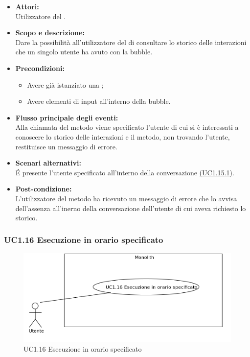 \begin{itemize}
	\item \textbf{Attori:}
	\\Utilizzatore del .
	\item \textbf{Scopo e descrizione:} 
	\\Dare la possibilità all'utilizzatore del  di consultare lo storico delle interazioni che un singolo utente ha avuto con la bubble.
	\item \textbf{Precondizioni:}
	\begin{itemize}
		\item Avere già istanziato una ;
		\item Avere elementi di input all'interno della bubble.
	\end{itemize}
	\item \textbf{Flusso principale degli eventi:}
	\\Alla chiamata del metodo viene specificato l'utente di cui si è interessati a conoscere lo storico delle interazioni e il metodo, non trovando l’utente, restituisce un messaggio di errore.
	\item \textbf{Scenari alternativi:}
	\\É presente l’utente specificato all'interno della conversazione \hyperref[UC1.15.1]{(UC1.15.1)}.
	\item \textbf{Post-condizione:}
	\\L’utilizzatore del metodo ha ricevuto un messaggio di errore che lo avvisa dell’assenza all’inerno della conversazione dell’utente di cui aveva richiesto lo storico.
\end{itemize}

\subsubsection{UC1.16 Esecuzione in orario specificato} \label{UC1.16}

\begin{figure}[H]
	\centering
	\includegraphics[width=15cm]{../../documenti/AnalisiDeiRequisiti/Diagrammi_img/uc1_16.png}
	\caption{UC1.16 Esecuzione in orario specificato}
\end{figure}

